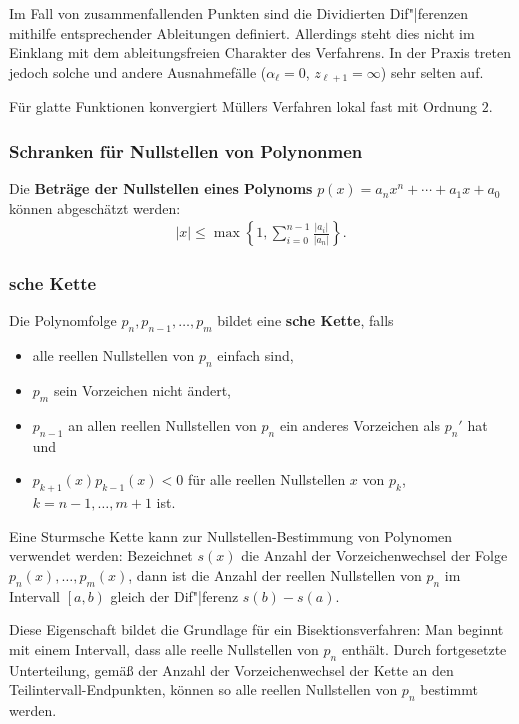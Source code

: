 Im Fall von zusammenfallenden Punkten sind die Dividierten Dif"|ferenzen
mithilfe entsprechender Ableitungen definiert.
Allerdings steht dies nicht im Einklang mit dem ableitungsfreien Charakter
des Verfahrens.
In der Praxis treten jedoch solche und andere Ausnahmefälle
($\alpha_\ell = 0$, $z_{\ell+1} = \infty$) sehr selten auf.

Für glatte Funktionen konvergiert Müllers Verfahren lokal fast mit Ordnung $2$.

\subsubsection{%
    Schranken für Nullstellen von Polynonmen%
}

Die \textbf{Beträge der Nullstellen eines Polynoms}
$p(x) = a_n x^n + \dotsb + a_1 x + a_0$ können abgeschätzt werden:
\begin{align*}
    |x| \le \max\left\{1, \sum_{i=0}^{n-1} \frac{|a_i|}{|a_n|}\right\}.
\end{align*}

\subsubsection{%
    sche Kette%
}

Die Polynomfolge $p_n, p_{n-1}, \dotsc, p_m$ bildet eine
\textbf{sche Kette}, falls
\begin{itemize}
    \item
    alle reellen Nullstellen von $p_n$ einfach sind,

    \item
    $p_m$ sein Vorzeichen nicht ändert,

    \item
    $p_{n-1}$ an allen reellen Nullstellen von $p_n$ ein anderes Vorzeichen
    als $p_n'$ hat und

    \item
    $p_{k+1}(x) p_{k-1}(x) < 0$ für alle reellen Nullstellen $x$ von $p_k$,
    $k = n - 1, \dotsc, m + 1$ ist.
\end{itemize}

Eine Sturmsche Kette kann zur Nullstellen-Bestimmung von Polynomen
verwendet werden:
Bezeichnet $s(x)$ die Anzahl der Vorzeichenwechsel der Folge
$p_n(x), \dotsc, p_m(x)$, dann ist die Anzahl der reellen Nullstellen von $p_n$
im Intervall $\left[a, b\right)$ gleich der Dif"|ferenz $s(b) - s(a)$.

Diese Eigenschaft bildet die Grundlage für ein Bisektionsverfahren:
Man beginnt mit einem Intervall, dass alle reelle Nullstellen von $p_n$
enthält.
Durch fortgesetzte Unterteilung, gemäß der Anzahl der Vorzeichenwechsel der
Kette an den Teilintervall-Endpunkten, können so alle reellen Nullstellen
von $p_n$ bestimmt werden.

